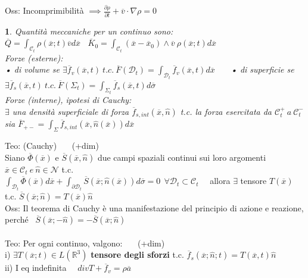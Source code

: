 \documentclass{article}
\theoremstyle{unnumbered}
\theoremstyle{unnumbered1}
\newtheorem* {theoremT1}{}
\newenvironment{Ndefi}{\begin{gBox}\begin{theoremT1}}{\end{theoremT1}\end{gBox}}
\begin{document}
%
Oss: Incomprimibilità $\implies \frac{\partial \rho}{\partial t} + \overline{v}\cdot\nabla\rho=0$\\
%
%
%
\begin{Ndefi}
Quantità meccaniche per un continuo sono: \ \ $\overline{Q}=\int_{\mathcal{C}_t}\rho(\overline{x};t)\overline{v}d\overline{x} \ \ \ \ \overline{K}_0=\int_{\mathcal{C}_t}(\overline{x}-\overline{x}_0)\wedge\overline{v}\ \rho(\overline{x};t)d\overline{x}$\\
%
Forze (esterne): \\ • di volume se $\exists \overline{f}_v(\overline{x},t) \ t.c. \ \overline{F}(\mathcal{D}_t)=\int_{\mathcal{D}_t}\overline{f}_v(\overline{x},t)d\overline{x}$ \ \ \
• di superficie se $\exists \overline{f}_s(\overline{x},t) \ t.c. \ \overline{F}(\Sigma_t)=\int_{\Sigma_t}\overline{f}_s(\overline{x},t)d\overline{\sigma}$\\
%
%
%
Forze (interne), ipotesi di Cauchy:\\
$\exists$ una densità superficiale di forza $\overline{f}_{s,int}(\overline{x},\hat{n})$ t.c. la forza esercitata da $\mathcal{C}^+_t \ a \ \mathcal{C}^-_t$ sia $\overline{F}_{+-}=\int_{\Sigma}\overline{f}_{s,int}(\overline{x},\hat{n}(\overline{x}))d\overline{x}$
\end{Ndefi}
%
%
%
Teo: (Cauchy) \ \ \ (+dim)\\
Siano $\overline{\Phi}(\overline{x})$ e $\overline{S}(\overline{x},\hat{n})$ due campi spaziali continui sui loro argomenti $\overline{x}\in\mathcal{C}_t \ e \ \hat{n}\in\mathcal{N}$ t.c.\\
$\int_{\mathcal{D}_t}\overline{\Phi}(\overline{x})d\overline{x} + \int_{\partial\mathcal{D}_t}\overline{S}(\overline{x};\hat{n}(\overline{x}))d\overline{\sigma}=0\ \ \forall\mathcal{D}_t\subset\mathcal{C}_t$ \ \ allora $\exists$ tensore $T(\overline{x})$ t.c. $\overline{S}(\overline{x};\hat{n})=T(\overline{x})\hat{n}$\\
%
Oss: Il teorema di Cauchy è una manifestazione del principio di azione e reazione, perché \ $\overline{S}(\overline{x};-\hat{n})=-\overline{S}(\overline{x};\hat{n})$ \\ \\
%
%
%
Teo: Per ogni continuo, valgono: \ \ \ (+dim)\\
i) $\exists T(\overline{x};t)\in L(\mathbb{R}^3)$ \textbf{tensore degli sforzi} t.c. $\overline{f}_s(\overline{x};\hat{n};t)=T(\overline{x},t)\hat{n}$\\
ii) I eq indefinita \ \ $divT + \overline{f}_v=\rho\overline{a}$\\
\end{document}
